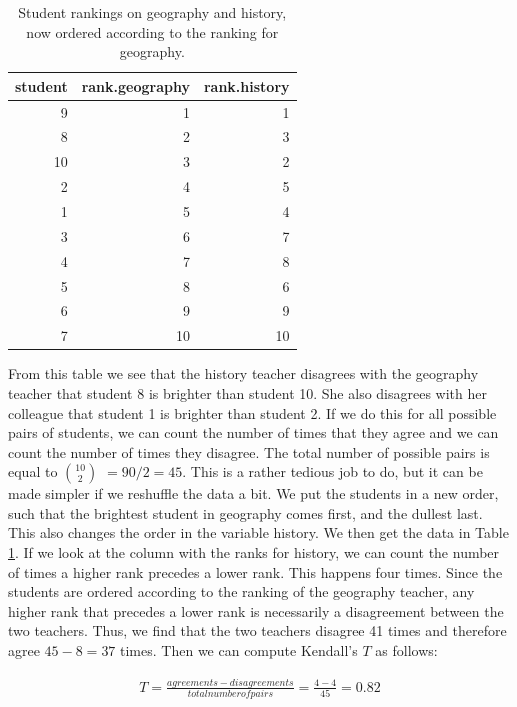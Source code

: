 \documentclass[]{report}\usepackage[]{graphicx}\usepackage[]{color}
\begin{document}
\begin{table}[ht]
\centering
\caption{Student rankings on geography and history, now ordered according to the ranking for geography.} 
\label{tab:nonpar_7}
\begin{tabular}{rrr}
  \hline
student & rank.geography & rank.history \\ 
  \hline
9 & 1 & 1 \\ 
  8 & 2 & 3 \\ 
  10 & 3 & 2 \\ 
  2 & 4 & 5 \\ 
  1 & 5 & 4 \\ 
  3 & 6 & 7 \\ 
  4 & 7 & 8 \\ 
  5 & 8 & 6 \\ 
  6 & 9 & 9 \\ 
  7 & 10 & 10 \\ 
   \hline
\end{tabular}
\end{table}


From this table we see that the history teacher disagrees with the geography teacher that student 8 is brighter than student 10. She also disagrees with her colleague that student 1 is brighter than student 2. If we do this for all possible pairs of students, we can count the number of times that they agree and we can count the number of times they disagree. The total number of possible pairs is equal to $10 \choose 2 $ $ = 90/2= 45$. This is a rather tedious job to do, but it can be made simpler if we reshuffle the data a bit. We put the students in a new order, such that the brightest student in geography comes first, and the dullest last. This also changes the order in the variable history. We then get the data in Table \ref{tab:nonpar_7}. If we look at the column with the ranks for history, we can count the number of times a higher rank precedes a lower rank. This happens four times. Since the students are ordered according to the ranking of the geography teacher, any higher rank that precedes a lower rank is necessarily a disagreement between the two teachers. Thus, we find that the two teachers disagree 41 times and therefore agree $45-8=37$ times. Then we can compute Kendall's $T$ as follows:
 
  \begin{eqnarray}
  T= \frac { agreements - disagreements }{total number of pairs} = \frac{4-4 }{45} = 0.82
  \end{eqnarray}
\end{document}
